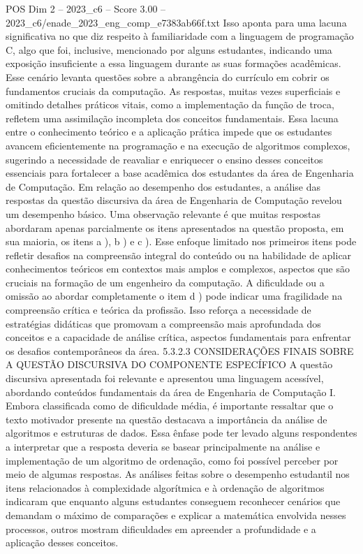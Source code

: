 \begin{textsample}{POS Dim 2 – 2023\_c6 – Score 3.00 – 2023\_c6/enade\_2023\_eng\_comp\_e7383ab66f.txt}
Isso aponta para uma lacuna significativa no que diz respeito à familiaridade com a linguagem de programação C, algo que foi, inclusive, mencionado por alguns estudantes, indicando uma exposição insuficiente a essa linguagem durante as suas formações acadêmicas.
Esse cenário levanta questões sobre a abrangência do currículo em cobrir os fundamentos cruciais da computação.
As respostas, muitas vezes superficiais e omitindo detalhes práticos vitais, como a implementação da função de troca, refletem uma assimilação incompleta dos conceitos fundamentais.
Essa lacuna entre o conhecimento teórico e a aplicação prática impede que os estudantes avancem eficientemente na programação e na execução de algoritmos complexos, sugerindo a necessidade de reavaliar e enriquecer o ensino desses conceitos essenciais para fortalecer a base acadêmica dos estudantes da área de Engenharia de Computação.
Em relação ao desempenho dos estudantes, a análise das respostas da questão discursiva da área de Engenharia de Computação revelou um desempenho básico.
Uma observação relevante é que muitas respostas abordaram apenas parcialmente os itens apresentados na questão proposta, em sua maioria, os itens a ), b ) e c ).
Esse enfoque limitado nos primeiros itens pode refletir desafios na compreensão integral do conteúdo ou na habilidade de aplicar conhecimentos teóricos em contextos mais amplos e complexos, aspectos que são cruciais na formação de um engenheiro da computação.
A dificuldade ou a omissão ao abordar completamente o item d ) pode indicar uma fragilidade na compreensão crítica e teórica da profissão.
Isso reforça a necessidade de estratégias didáticas que promovam a compreensão mais aprofundada dos conceitos e a capacidade de análise crítica, aspectos fundamentais para enfrentar os desafios contemporâneos da área. 5.3.2.3 CONSIDERAÇÕES FINAIS SOBRE A QUESTÃO DISCURSIVA DO COMPONENTE ESPECÍFICO A questão discursiva apresentada foi relevante e apresentou uma linguagem acessível, abordando conteúdos fundamentais da área de Engenharia de Computação I.
Embora classificada como de dificuldade média, é importante ressaltar que o texto motivador presente na questão destacava a importância da análise de algoritmos e estruturas de dados.
Essa ênfase pode ter levado alguns respondentes a interpretar que a resposta deveria se basear principalmente na análise e implementação de um algoritmo de ordenação, como foi possível perceber por meio de algumas respostas.
As análises feitas sobre o desempenho estudantil nos itens relacionados à complexidade algorítmica e à ordenação de algoritmos indicaram que enquanto alguns estudantes conseguem reconhecer cenários que demandam o máximo de comparações e explicar a matemática envolvida nesses processos, outros mostram dificuldades em apreender a profundidade e a aplicação desses conceitos.

\end{textsample}
